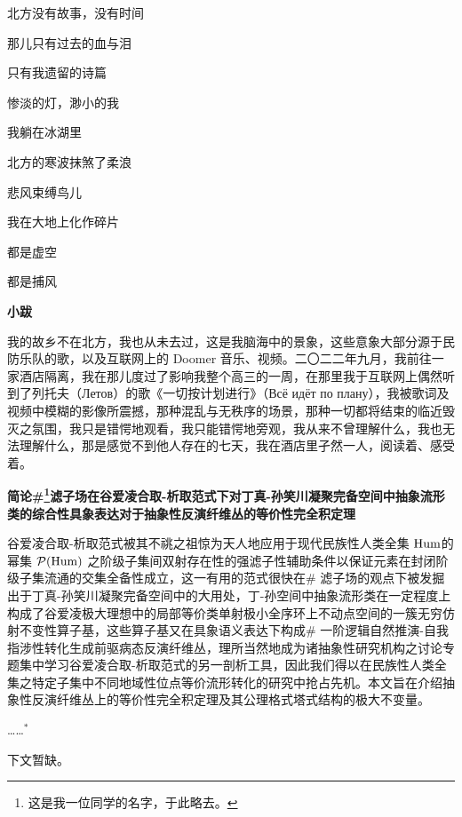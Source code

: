 \documentclass{ctexbook}
\begin{document}
\mbox


    北方没有故事，没有时间
    
    那儿只有过去的血与泪
    
    只有我遗留的诗篇
    
    惨淡的灯，渺小的我
    
    我躺在冰湖里


\mbox


    北方的寒波抹煞了柔浪
    
    悲风束缚鸟儿
    
    我在大地上化作碎片
    
    都是虚空
    
    都是捕风


\mbox


    {\normalsize \textbf{小跋}}

    {\normalsize 我的故乡不在北方，我也从未去过，这是我脑海中的景象，这些意象大部分源于民防乐队的歌，以及互联网上的 Doomer 音乐、视频。二〇二二年九月，我前往一家酒店隔离，我在那儿度过了影响我整个高三的一周，在那里我于互联网上偶然听到了列托夫（\textrussian{Летов}）的歌《一切按计划进行》（\textrussian{Всё идёт по плану}），我被歌词及视频中模糊的影像所震撼，那种混乱与无秩序的场景，那种一切都将结束的临近毁灭之氛围，我只是错愕地观看，我只能错愕地旁观，我从来不曾理解什么，我也无法理解什么，那是感觉不到他人存在的七天，我在酒店里孑然一人，阅读着、感受着。}

\newpage
\textbf{简论\#\footnote{\normalsize 这是我一位同学的名字，于此略去。}滤子场在谷爱凌合取-析取范式下对丁真-孙笑川凝聚完备空间中抽象流形类的综合性具象表达对于抽象性反演纤维丛的等价性完全积定理}


\mbox


    谷爱凌合取-析取范式被其不祧之祖惊为天人地应用于现代民族性人类全集 \({\rm Hum}\)的幂集 \(\mathcal{P}({\rm Hum})\)  之阶级子集间双射存在性的强滤子性辅助条件以保证元素在封闭阶级子集流通的交集全备性成立，这一有用的范式很快在\# 滤子场的观点下被发掘出于丁真-孙笑川凝聚完备空间中的大用处，丁-孙空间中抽象流形类在一定程度上构成了谷爱凌极大理想中的局部等价类单射极小全序环上不动点空间的一簇无穷仿射不变性算子基，这些算子基又在具象语义表达下构成\# 一阶逻辑自然推演-自我指涉性转化生成前驱病态反演纤维丛，理所当然地成为诸抽象性研究机构之讨论专题集中学习谷爱凌合取-析取范式的另一剖析工具，因此我们得以在民族性人类全集之特定子集中不同地域性位点等价流形转化的研究中抢占先机。本文旨在介绍抽象性反演纤维丛上的等价性完全积定理及其公理格式塔式结构的极大不变量。
    
    ……\(^*\)

    {\normalsize *下文暂缺。}
\end{document}
